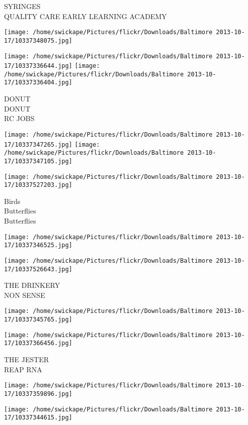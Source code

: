 \documentclass[10pt,letterpaper]{article}
\begin{document}
SYRINGES\\
QUALITY CARE EARLY LEARNING ACADEMY
\pagebreak

\texttt{[image: /home/swickape/Pictures/flickr/Downloads/Baltimore 2013-10-17/10337348075.jpg]}

\vspace{0.25in}
\texttt{[image: /home/swickape/Pictures/flickr/Downloads/Baltimore 2013-10-17/10337336644.jpg]}
\texttt{[image: /home/swickape/Pictures/flickr/Downloads/Baltimore 2013-10-17/10337336404.jpg]}

DONUT\\
DONUT\\
RC JOBS
\pagebreak

\texttt{[image: /home/swickape/Pictures/flickr/Downloads/Baltimore 2013-10-17/10337347265.jpg]}
\texttt{[image: /home/swickape/Pictures/flickr/Downloads/Baltimore 2013-10-17/10337347105.jpg]}

\texttt{[image: /home/swickape/Pictures/flickr/Downloads/Baltimore 2013-10-17/10337527203.jpg]}

Birds\\
Butterflies\\
Butterflies
\pagebreak

\texttt{[image: /home/swickape/Pictures/flickr/Downloads/Baltimore 2013-10-17/10337346525.jpg]}

\vspace{0.25in}
\texttt{[image: /home/swickape/Pictures/flickr/Downloads/Baltimore 2013-10-17/10337526643.jpg]}

THE DRINKERY\\
NON SENSE
\pagebreak

\texttt{[image: /home/swickape/Pictures/flickr/Downloads/Baltimore 2013-10-17/10337345765.jpg]}

\vspace{0.25in}
\texttt{[image: /home/swickape/Pictures/flickr/Downloads/Baltimore 2013-10-17/10337366456.jpg]}

THE JESTER\\
REAP RNA
\pagebreak

\texttt{[image: /home/swickape/Pictures/flickr/Downloads/Baltimore 2013-10-17/10337359896.jpg]}

\vspace{0.25in}
\texttt{[image: /home/swickape/Pictures/flickr/Downloads/Baltimore 2013-10-17/10337344615.jpg]}
\end{document}
